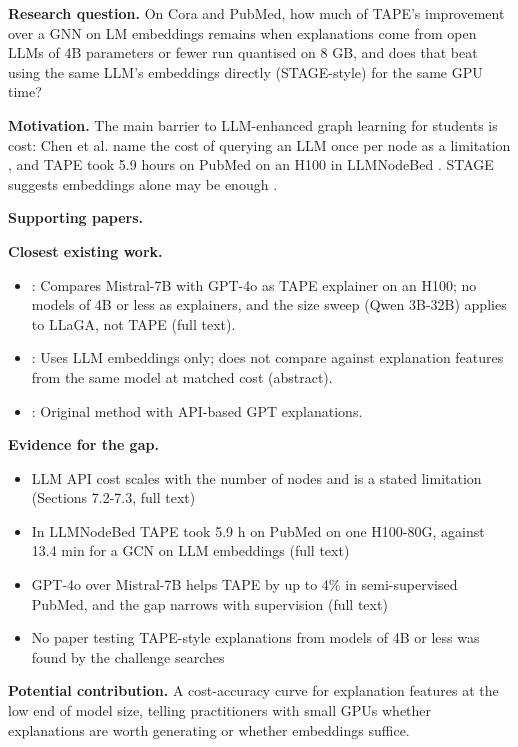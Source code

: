 \documentclass[11pt,a4paper]{article}
\begin{document}
\textbf{Research question.} On Cora and PubMed, how much of TAPE's improvement over a GNN on LM embeddings remains when explanations come from open LLMs of 4B parameters or fewer run quantised on 8 GB, and does that beat using the same LLM's embeddings directly (STAGE-style) for the same GPU time?

\textbf{Motivation.} The main barrier to LLM-enhanced graph learning for students is cost: Chen et al. name the cost of querying an LLM once per node as a limitation \cite{chen2024exploring}, and TAPE took 5.9 hours on PubMed on an H100 in LLMNodeBed \cite{wu2025llmnodebed}. STAGE suggests embeddings alone may be enough \cite{zolnai2024stage}.

\textbf{Supporting papers.} \cite{he2023tape,chen2024exploring,zolnai2024stage,wu2025llmnodebed}

\textbf{Closest existing work.}
\begin{itemize}
\item \cite{wu2025llmnodebed}: Compares Mistral-7B with GPT-4o as TAPE explainer on an H100; no models of 4B or less as explainers, and the size sweep (Qwen 3B-32B) applies to LLaGA, not TAPE (full text).
\item \cite{zolnai2024stage}: Uses LLM embeddings only; does not compare against explanation features from the same model at matched cost (abstract).
\item \cite{he2023tape}: Original method with API-based GPT explanations.
\end{itemize}

\textbf{Evidence for the gap.}
\begin{itemize}
\item [V] LLM API cost scales with the number of nodes and is a stated limitation (Sections 7.2-7.3, full text) \cite{chen2024exploring}
\item [V] In LLMNodeBed TAPE took 5.9 h on PubMed on one H100-80G, against 13.4 min for a GCN on LLM embeddings (full text) \cite{wu2025llmnodebed}
\item [V] GPT-4o over Mistral-7B helps TAPE by up to 4\% in semi-supervised PubMed, and the gap narrows with supervision (full text) \cite{wu2025llmnodebed}
\item [E] No paper testing TAPE-style explanations from models of 4B or less was found by the challenge searches
\end{itemize}

\textbf{Potential contribution.} A cost-accuracy curve for explanation features at the low end of model size, telling practitioners with small GPUs whether explanations are worth generating or whether embeddings suffice.
\end{document}
